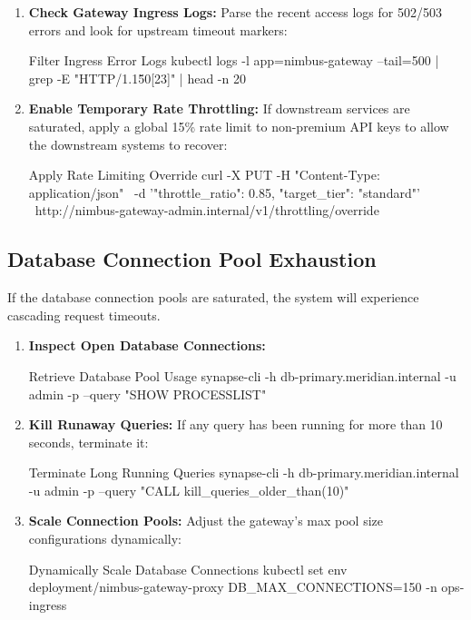 \begin{enumerate}
    \item \textbf{Check Gateway Ingress Logs:} Parse the recent access logs for 502/503 errors and look for upstream timeout markers:
    \begin{codeblock}{Filter Ingress Error Logs}
kubectl logs -l app=nimbus-gateway --tail=500 | grep -E "HTTP/1.1\" 50[23]" | head -n 20
    \end{codeblock}
    
    \item \textbf{Enable Temporary Rate Throttling:} If downstream services are saturated, apply a global 15\% rate limit to non-premium API keys to allow the downstream systems to recover:
    \begin{codeblock}{Apply Rate Limiting Override}
curl -X PUT -H "Content-Type: application/json" \
  -d '{"throttle_ratio": 0.85, "target_tier": "standard"}' \
  http://nimbus-gateway-admin.internal/v1/throttling/override
    \end{codeblock}
\end{enumerate}

\subsection{Database Connection Pool Exhaustion}
\label{sub:db_remediation}
If the database connection pools are saturated, the system will experience cascading request timeouts.

\begin{enumerate}
    \item \textbf{Inspect Open Database Connections:}
    \begin{codeblock}{Retrieve Database Pool Usage}
synapse-cli -h db-primary.meridian.internal -u admin -p --query "SHOW PROCESSLIST"
    \end{codeblock}
    
    \item \textbf{Kill Runaway Queries:} If any query has been running for more than 10 seconds, terminate it:
    \begin{codeblock}{Terminate Long Running Queries}
synapse-cli -h db-primary.meridian.internal -u admin -p --query "CALL kill_queries_older_than(10)"
    \end{codeblock}
    
    \item \textbf{Scale Connection Pools:} Adjust the gateway's max pool size configurations dynamically:
    \begin{codeblock}{Dynamically Scale Database Connections}
kubectl set env deployment/nimbus-gateway-proxy DB_MAX_CONNECTIONS=150 -n ops-ingress
    \end{codeblock}
\end{enumerate}
